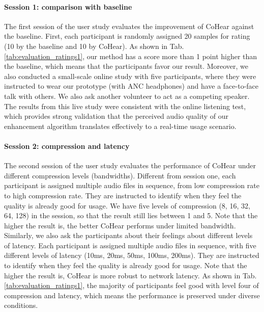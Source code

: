 \paragraph{Session 1: comparison with baseline}
The first session of the user study evaluates the improvement of CoHear against the baseline.
First, each participant is randomly assigned 20 samples for rating (10 by the baseline \cite{veluri2024look} and 10 by CoHear).
As shown in Tab. \ref{tab:evaluation_ratings1}, our method has a score more than 1 point higher than the baseline, which means that the participants favor our result.
Moreover, we also conducted a small-scale online study with five participants, where they were instructed to wear our prototype (with ANC headphones) and have a face-to-face talk with others. We also ask another volunteer to act as a competing speaker.
The results from this live study were consistent with the online listening test, which provides strong validation that the perceived audio quality of our enhancement algorithm translates effectively to a real-time usage scenario.

\paragraph{Session 2: compression and latency}
The second session of the user study evaluates the performance of CoHear under different compression levels (bandwidths). Different from session one, each participant is assigned multiple audio files in sequence, from low compression rate to high compression rate. They are instructed to identify when they feel the quality is already good for usage. We have five levels of compression (8, 16, 32, 64, 128) in the session, so that the result still lies between 1 and 5. Note that the higher the result is, the better CoHear performs under limited bandwidth. Similarly, we also ask the participants about their feelings about different levels of latency. Each participant is assigned multiple audio files in sequence, with five different levels of latency (10ms, 20ms, 50ms, 100ms, 200ms). They are instructed to identify when they feel the quality is already good for usage. Note that the higher the result is, CoHear is more robust to network latency. As shown in Tab. \ref{tab:evaluation_ratings1}, the majority of participants feel good with level four of compression and latency, which means the performance is preserved under diverse conditions.

